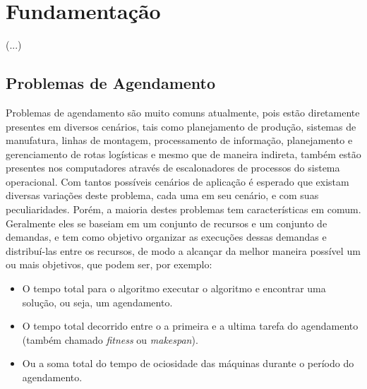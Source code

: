 \chapter{Fundamentação}
(...)

\section{Problemas de Agendamento}
Problemas de agendamento são muito comuns atualmente, pois estão diretamente presentes em diversos cenários, tais como planejamento de produção, sistemas de manufatura, linhas de montagem, processamento de informação, planejamento e gerenciamento de rotas logísticas e mesmo que de maneira indireta, também estão presentes nos computadores através de escalonadores de processos do sistema operacional.
%
Com tantos possíveis cenários de aplicação é esperado que existam diversas variações deste problema, cada uma em seu cenário, e com suas peculiaridades. Porém, a maioria destes problemas tem características em comum. Geralmente eles se baseiam em um conjunto de recursos e um conjunto de demandas, e tem como objetivo organizar as execuções dessas demandas e distribuí-las entre os recursos, de modo a alcançar da melhor maneira possível um ou mais objetivos, que podem ser, por exemplo: 
\begin{itemize}
    \item O tempo total para o algoritmo executar o algoritmo e encontrar uma solução, ou seja, um agendamento.
    \item O tempo total decorrido entre o a primeira e a ultima tarefa do agendamento (também chamado \textit{fitness} ou \textit{makespan}).
    \item Ou a soma total do tempo de ociosidade das máquinas durante o período do agendamento.\\
\end{itemize}

